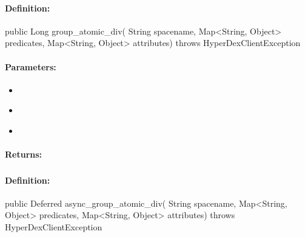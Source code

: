 \paragraph{Definition:}
\begin{javacode}
public Long group_atomic_div(
        String spacename,
        Map<String, Object> predicates,
        Map<String, Object> attributes) throws HyperDexClientException
\end{javacode}

\paragraph{Parameters:}
\begin{itemize}[noitemsep]
\item {}\\

\item {}\\

\item {}\\

\end{itemize}

\paragraph{Returns:}


\pagebreak
\subsubsection{}
\label{api:java:async_group_atomic_div}


\paragraph{Definition:}
\begin{javacode}
public Deferred async_group_atomic_div(
        String spacename,
        Map<String, Object> predicates,
        Map<String, Object> attributes) throws HyperDexClientException
\end{javacode}

